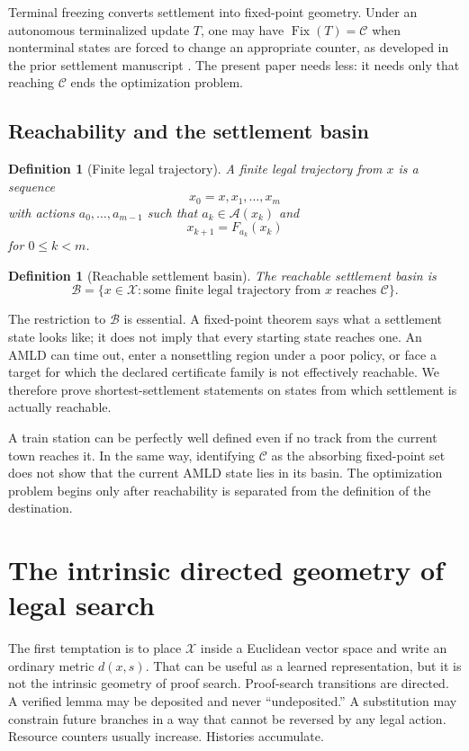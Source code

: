 \documentclass[11pt,letterpaper]{article}
\newtheorem{definition}[theorem]{Definition}
\theoremstyle{remark}
\newcommand{\X}{\mathcal X}
\newcommand{\Cset}{\mathcal C}
\newcommand{\Basin}{\mathcal B}
\newcommand{\A}{\mathcal A}
\newcommand{\Fix}{\operatorname{Fix}}
\begin{document}
Terminal freezing converts settlement into fixed-point geometry. Under an autonomous terminalized update $T$, one may have $\Fix(T)=\Cset$ when nonterminal states are forced to change an appropriate counter, as developed in the prior settlement manuscript \cite{VSS}. The present paper needs less: it needs only that reaching $\Cset$ ends the optimization problem.

\subsection{Reachability and the settlement basin}

\begin{definition}[Finite legal trajectory]
A finite legal trajectory from $x$ is a sequence
\[
x_0=x,x_1,\ldots,x_m
\]
with actions $a_0,\ldots,a_{m-1}$ such that $a_k\in\A(x_k)$ and
\[
x_{k+1}=F_{a_k}(x_k)
\]
for $0\le k<m$.
\end{definition}

\begin{definition}[Reachable settlement basin]
The reachable settlement basin is
\[
\Basin=\{x\in\X:\text{some finite legal trajectory from $x$ reaches $\Cset$}\}.
\]
\end{definition}

The restriction to $\Basin$ is essential. A fixed-point theorem says what a settlement state looks like; it does not imply that every starting state reaches one. An AMLD can time out, enter a nonsettling region under a poor policy, or face a target for which the declared certificate family is not effectively reachable. We therefore prove shortest-settlement statements on states from which settlement is actually reachable.

\begin{storybox}
A train station can be perfectly well defined even if no track from the current town reaches it. In the same way, identifying $\Cset$ as the absorbing fixed-point set does not show that the current AMLD state lies in its basin. The optimization problem begins only after reachability is separated from the definition of the destination.
\end{storybox}

\section{The intrinsic directed geometry of legal search}\label{sec:distance}

The first temptation is to place $\X$ inside a Euclidean vector space and write an ordinary metric $d(x,s)$. That can be useful as a learned representation, but it is not the intrinsic geometry of proof search. Proof-search transitions are directed. A verified lemma may be deposited and never ``undeposited.'' A substitution may constrain future branches in a way that cannot be reversed by any legal action. Resource counters usually increase. Histories accumulate.
\end{document}

